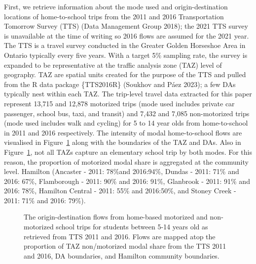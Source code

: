 \documentclass[
default
]{sn-jnl}
\begin{document}
First, we retrieve information about the mode used and
origin-destination locations of home-to-school trips from the 2011 and
2016 Transportation Tomorrow Survey (TTS) (Data Management Group 2018);
the 2021 TTS survey is unavailable at the time of writing so 2016 flows
are assumed for the 2021 year. The TTS is a travel survey conducted in
the Greater Golden Horseshoe Area in Ontario typically every five years.
With a target 5\% sampling rate, the survey is expanded to be
representative at the traffic analysis zone (TAZ) level of geography.
TAZ are spatial units created for the purpose of the TTS and pulled from
the R data package \{TTS2016R\} (Soukhov and Páez 2023); a few DAs
typically nest within each TAZ. The trip-level travel data extracted for
this paper represent 13,715 and 12,878 motorized trips (mode used
includes private car passenger, school bus, taxi, and transit) and 7,432
and 7,085 non-motorized trips (mode used includes walk and cycling) for
5 to 14 year olds from home-to-school in 2011 and 2016 respectively. The
intensity of modal home-to-school flows are visualised in
Figure~\ref{fig-Fig4} along with the boundaries of the TAZ and DAs. Also
in Figure~\ref{fig-Fig4}, not all TAZs capture an elementary school trip
by both modes. For this reason, the proportion of motorized modal share
is aggregated at the community level. Hamilton (Ancaster - 2011: 78\%and
2016:94\%, Dundas - 2011: 71\% and 2016: 67\%, Flamborough - 2011: 90\%
and 2016: 91\%, Glanbrook - 2011: 91\% and 2016: 78\%, Hamilton Central
- 2011: 55\% and 2016:50\%, and Stoney Creek - 2011: 71\% and 2016:
79\%).

\begin{figure}[H]


\caption{\label{fig-Fig4}The origin-destination flows from home-based
motorized and non-motorized school trips for students between 5-14 years
old as retrieved from TTS 2011 and 2016. Flows are mapped atop the
proportion of TAZ non/motorized modal share from the TTS 2011 and 2016,
DA boundaries, and Hamilton community boundaries.}

\end{figure}%
\end{document}
